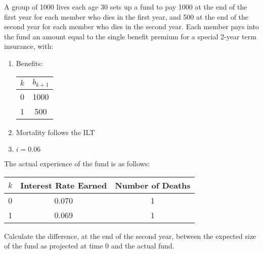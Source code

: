  A group of 1000 lives each age 30 sets up a fund to pay 1000 at the end of the first year for
each member who dies in the first year, and 500 at the end of the second year for each
member who dies in the second year. Each member pays into the fund an amount equal to
the single benefit premium for a special 2-year term insurance, with:
\begin{enumerate}
\item Benefits:
  \begin{center}\begin{tabular}{c|c}
    $k$ & $b_{k+1}$ \\ \hline
    0 & 1000 \\
    1 & 500 
  \end{tabular}\end{center}
\item Mortality follows the ILT
\item $i = 0.06$
\end{enumerate}
The actual experience of the fund is as follows:
  \begin{center}\begin{tabular}{ccc}
   $k$ & Interest Rate Earned & Number of Deaths \\ \hline
   0 & 0.070 & 1 \\
   1 & 0.069 & 1 
  \end{tabular}\end{center}
Calculate the difference, at the end of the second year, between the expected size of the fund
as projected at time 0 and the actual fund.


 




 
